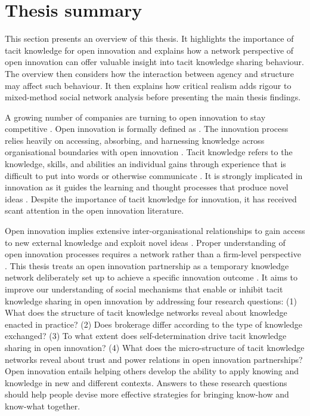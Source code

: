 \section{Thesis summary}

This section presents an overview of this thesis. It highlights the importance of tacit knowledge for open innovation and explains how a network perspective of open innovation can offer valuable insight into tacit knowledge sharing behaviour. The overview then considers how the interaction between agency and structure may affect such behaviour. It then explains how critical realism adds rigour to mixed-method social network analysis before presenting the main thesis findings. \medskip   

A growing number of companies are turning to open innovation to stay competitive \citep{stanko2017under}. Open innovation is formally defined as  \citep{chesbrough2014explicating}. The innovation process relies heavily on accessing, absorbing, and harnessing knowledge across organisational boundaries with open innovation \citep{chesbrough2012open}. Tacit knowledge refers to the knowledge, skills, and abilities an individual gains through experience that is difficult to put into words or otherwise communicate \citep{kreutz2014catalyzing}. It is strongly implicated in innovation as it guides the learning and thought processes that produce novel ideas \citep{leonard1998role,lam2000tacit}. Despite the importance of tacit knowledge for innovation, it has received scant attention in the open innovation literature. \medskip

Open innovation implies extensive inter-organisational relationships to gain access to new external knowledge and exploit novel ideas \citep{chiaroni2011open}. Proper understanding of open innovation processes requires a network rather than a firm-level perspective \citep{fichter2009innovation,martinez2014analysis,yun2016network}. This thesis treats an open innovation partnership as a temporary knowledge network deliberately set up to achieve a specific innovation outcome \citep{turner2003natureoftheproject,terhorst2018tacit}. It aims to improve our understanding of social mechanisms that enable or inhibit tacit knowledge sharing in open innovation by addressing four research questions: (1) What does the structure of tacit knowledge networks reveal about knowledge enacted in practice? (2) Does brokerage differ according to the type of knowledge exchanged? (3) To what extent does self-determination drive tacit knowledge sharing in open innovation? (4) What does the micro-structure of tacit knowledge networks reveal about trust and power relations in open innovation partnerships? Open innovation entails helping others develop the ability to apply knowing and knowledge in new and different contexts. Answers to these research questions should help people devise more effective strategies for bringing know-how and know-what together. \medskip

